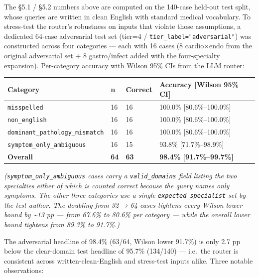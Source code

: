 \documentclass[
  american,
  a4paper,
]{article}
\begin{document}
The §5.1 / §5.2 numbers above are computed on the 140-case held-out test
split, whose queries are written in clean English with standard medical
vocabulary. To stress-test the router's robustness on inputs that
violate those assumptions, a dedicated 64-case adversarial test set
(tier=4 / \texttt{tier\_label="adversarial"}) was constructed across
four categories --- each with 16 cases (8 cardio×endo from the original
adversarial set + 8 gastro/infect added with the four-specialty
expansion). Per-category accuracy with Wilson 95\% CIs from the LLM
router:

\begin{longtable}[]{@{}llll@{}}
\toprule\noalign{}
Category & n & Correct & Accuracy {[}Wilson 95\% CI{]} \\
\midrule\noalign{}
\endhead
\bottomrule\noalign{}
\endlastfoot
\texttt{misspelled} & 16 & 16 & 100.0\% {[}80.6\%--100.0\%{]} \\
\texttt{non\_english} & 16 & 16 & 100.0\% {[}80.6\%--100.0\%{]} \\
\texttt{dominant\_pathology\_mismatch} & 16 & 16 & 100.0\%
{[}80.6\%--100.0\%{]} \\
\texttt{symptom\_only\_ambiguous} & 16 & 15 & 93.8\%
{[}71.7\%--98.9\%{]} \\
\textbf{Overall} & \textbf{64} & \textbf{63} & \textbf{98.4\%
{[}91.7\%--99.7\%{]}} \\
\end{longtable}

\emph{(\texttt{symptom\_only\_ambiguous} cases carry a
\texttt{valid\_domains} field listing the two specialties either of
which is counted correct because the query names only symptoms. The
other three categories use a single \texttt{expected\_specialist} set by
the test author. The doubling from 32 → 64 cases tightens every Wilson
lower bound by \textasciitilde13 pp --- from 67.6\% to 80.6\% per
category --- while the overall lower bound tightens from 89.3\% to
91.7\%.)}

The adversarial headline of 98.4\% (63/64, Wilson lower 91.7\%) is only
2.7 pp below the clear-domain test headline of 95.7\% (134/140) ---
i.e.~the router is consistent across written-clean-English and
stress-test inputs alike. Three notable observations:
\end{document}
